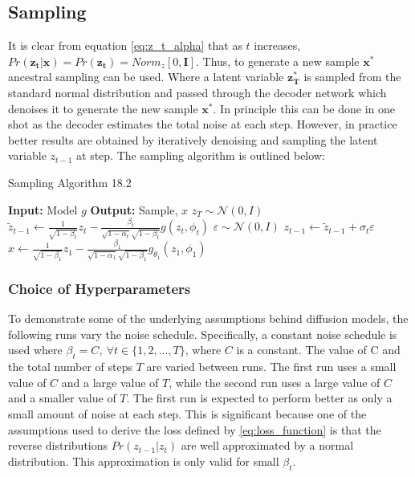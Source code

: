 \documentclass[11pt]{article}
\begin{document}
\subsection{Sampling}
It is clear from equation \ref{eq:z_t_alpha} that as $t$ increases, $Pr(\mathbf{z_t}|\mathbf{x})=Pr(\mathbf{z_t})=Norm_z[0,\mathbf{I}]$. Thus, to generate a new sample $\mathbf{x^*}$ ancestral sampling can be used. Where a latent variable $\mathbf{z_T^*}$ is sampled from the standard normal distribution and passed through the decoder network which denoises it to generate the new sample $\mathbf{x^*}$. In principle this can be done in one shot as the decoder estimates the total noise at each step. However, in practice better results are obtained by iteratively denoising and sampling the latent variable $z_{t-1}$ at step. The sampling algorithm is outlined below:

\begin{algorithm}
    \caption{Sampling Algorithm 18.2}
    \begin{algorithmic}[1]
    \State \textbf{Input:} Model $g$
    \State \textbf{Output:} Sample, $x$
    \State $z_T \sim \mathcal{N}(0, I)$ 
        \State $\tilde{z}_{t-1} \gets \frac{1}{\sqrt{1-\beta_t}} z_t - \frac{\beta_t}{\sqrt{1-\alpha_t}\sqrt{1-\beta_t}} g(z_t, \phi_t)$ 
        \State $\varepsilon \sim \mathcal{N}(0, I)$ 
        \State $z_{t-1} \gets \tilde{z}_{t-1} + \sigma_t \varepsilon$ 
    \EndFor
    \State $x \gets \frac{1}{\sqrt{1-\beta_1}} z_1 - \frac{\beta_1}{\sqrt{1-\alpha_1}\sqrt{1-\beta_1}} g_{\theta_1}(z_1, \phi_1)$ 
    \end{algorithmic}
\end{algorithm}

\subsubsection{Choice of Hyperparameters}
To demonstrate some of the underlying assumptions behind diffusion models, the following runs vary the noise schedule.
Specifically, a constant noise schedule is used where $\beta_t = C, \ \forall t \in \{1,2,...,T\}$, where $C$ is a constant.
The value of C and the total number of steps $T$ are varied between runs. The first run uses a small value of $C$ and a large value of $T$, while the second run uses a large value of $C$ and a smaller value of $T$. The first run is expected to perform better as only a small amount of noise at each step. This is significant because one of the assumptions used to derive the loss defined by \ref{eq:loss_function} is that the reverse distributions $Pr(z_{t-1}|z_{t})$ are well approximated by a normal distribution. This approximation is only valid for small $\beta_t$.
\end{document}
